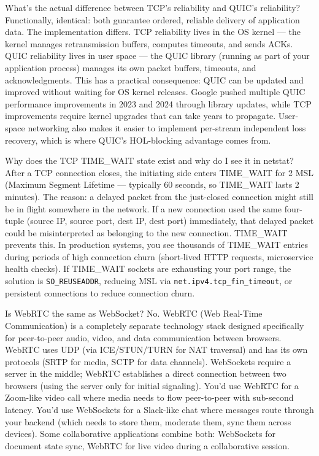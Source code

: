 \documentclass[11pt,a4paper]{article}
\begin{document}
\begin{curiobox}{What's the actual difference between TCP's reliability and QUIC's reliability?}
Functionally, identical: both guarantee ordered, reliable delivery of application data. The implementation differs. TCP reliability lives in the OS kernel --- the kernel manages retransmission buffers, computes timeouts, and sends ACKs. QUIC reliability lives in user space --- the QUIC library (running as part of your application process) manages its own packet buffers, timeouts, and acknowledgments. This has a practical consequence: QUIC can be updated and improved without waiting for OS kernel releases. Google pushed multiple QUIC performance improvements in 2023 and 2024 through library updates, while TCP improvements require kernel upgrades that can take years to propagate. User-space networking also makes it easier to implement per-stream independent loss recovery, which is where QUIC's HOL-blocking advantage comes from.
\end{curiobox}

\vspace{6pt}

\begin{curiobox}{Why does the TCP TIME\_WAIT state exist and why do I see it in netstat?}
After a TCP connection closes, the initiating side enters TIME\_WAIT for 2 \texttimes MSL (Maximum Segment Lifetime --- typically 60 seconds, so TIME\_WAIT lasts 2 minutes). The reason: a delayed packet from the just-closed connection might still be in flight somewhere in the network. If a new connection used the same four-tuple (source IP, source port, dest IP, dest port) immediately, that delayed packet could be misinterpreted as belonging to the new connection. TIME\_WAIT prevents this. In production systems, you see thousands of TIME\_WAIT entries during periods of high connection churn (short-lived HTTP requests, microservice health checks). If TIME\_WAIT sockets are exhausting your port range, the solution is \texttt{SO\_REUSEADDR}, reducing MSL via \texttt{net.ipv4.tcp\_fin\_timeout}, or persistent connections to reduce connection churn.
\end{curiobox}

\vspace{6pt}

\begin{curiobox}{Is WebRTC the same as WebSocket?}
No. WebRTC (Web Real-Time Communication) is a completely separate technology stack designed specifically for peer-to-peer audio, video, and data communication between browsers. WebRTC uses UDP (via ICE/STUN/TURN for NAT traversal) and has its own protocols (SRTP for media, SCTP for data channels). WebSockets require a server in the middle; WebRTC establishes a direct connection between two browsers (using the server only for initial signaling). You'd use WebRTC for a Zoom-like video call where media needs to flow peer-to-peer with sub-second latency. You'd use WebSockets for a Slack-like chat where messages route through your backend (which needs to store them, moderate them, sync them across devices). Some collaborative applications combine both: WebSockets for document state sync, WebRTC for live video during a collaborative session.
\end{curiobox}
\end{document}
